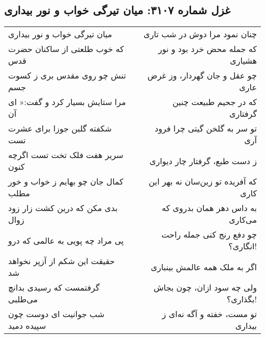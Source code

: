 \begin{center}
\section*{غزل شماره ۳۱۰۷: میان تیرگی خواب و نور بیداری}
\label{sec:3107}
\begin{longtable}{l p{0.5cm} r}
میان تیرگی خواب و نور بیداری
&&
چنان نمود مرا دوش در شب تاری
\\
که خوب طلعتی از ساکنان حضرت قدس
&&
که جمله محض خرد بود و نور هشیاری
\\
تنش چو روی مقدس بری ز کسوت جسم
&&
چو عقل و جان گهردار، وز غرض عاری
\\
مرا ستایش بسیار کرد و گفت:« ای آن
&&
که در جحیم طبیعت چنین گرفتاری
\\
شکفته گلبن جوزا برای عشرت تست
&&
تو سر به گلخن گیتی چرا فرود آری
\\
سریر هفت فلک تخت تست اگرچه کنون
&&
ز دست طبع، گرفتار چار دیواری
\\
کمال جان چو بهایم ز خواب و خور مطلب
&&
که آفریده تو زین‌سان نه بهر این کاری
\\
بدی مکن که درین کشت زار زود زوال
&&
به داس دهر همان بدروی که می‌کاری
\\
پی مراد چه پویی به عالمی که درو
&&
چو دفع رنج کنی جمله راحت انگاری؟!
\\
حقیقت این شکم از آزپر نخواهد شد
&&
اگر به ملک همه عالمش بینباری
\\
گرفتمست که رسیدی بدانچ می‌طلبی
&&
ولی چه سود ازان، چون بجاش بگذاری؟!
\\
شب جوانیت ای دوست چون سپیده دمید
&&
تو مست، خفته و آگه نه‌ای ز بیداری
\\
\end{longtable}
\end{center}

